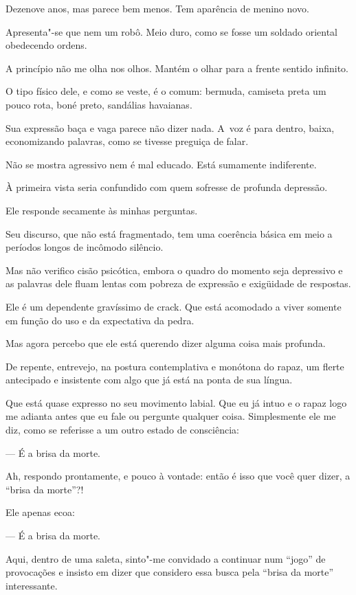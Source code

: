  

Dezenove anos, mas parece bem menos. Tem aparência de menino novo.

Apresenta"-se que nem um robô. Meio duro, como se fosse um soldado
oriental obedecendo ordens.

A princípio não me olha nos olhos. Mantém o olhar para a frente sentido
infinito.

O tipo físico dele, e como se veste, é o comum: bermuda, camiseta preta
um pouco rota, boné preto, sandálias havaianas.

Sua expressão baça e vaga parece não dizer nada. A~voz é para dentro,
baixa, economizando palavras, como se tivesse preguiça de falar.

Não se mostra agressivo nem é mal educado. Está sumamente indiferente.

À primeira vista seria confundido com quem sofresse de profunda
depressão.

Ele responde secamente às minhas perguntas.

Seu discurso, que não está fragmentado, tem uma coerência básica em meio
a períodos longos de incômodo silêncio.

Mas não verifico cisão psicótica, embora o quadro do momento seja
depressivo e as palavras dele fluam lentas com pobreza de expressão e
exigüidade de respostas.

Ele é um dependente gravíssimo de crack. Que está acomodado a viver
somente em função do uso e da expectativa da pedra.

Mas agora percebo que ele está querendo dizer alguma coisa mais
profunda.

De repente, entrevejo, na postura contemplativa e monótona do rapaz, um
flerte antecipado e insistente com algo que já está na ponta de sua
língua.

Que está quase expresso no seu movimento labial. Que eu já intuo e o
rapaz logo me adianta antes que eu fale ou pergunte qualquer coisa.
Simplesmente ele me diz, como se referisse a um outro estado de
consciência:

— É a brisa da morte.

Ah, respondo prontamente, e pouco à vontade: então é isso que você quer
dizer, a ``brisa da morte''?!

Ele apenas ecoa:

— É a brisa da morte.

Aqui, dentro de uma saleta, sinto"-me convidado a continuar num ``jogo''
de provocações e insisto em dizer que considero essa busca pela ``brisa
da morte'' interessante.

